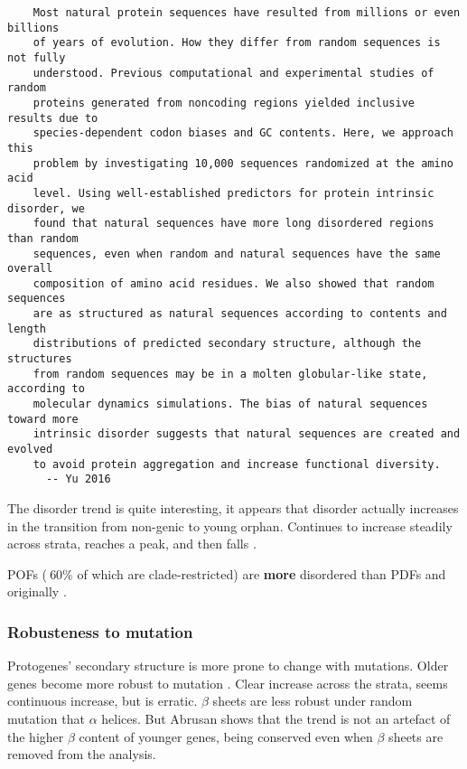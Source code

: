     \begin{verbatim}
    Most natural protein sequences have resulted from millions or even billions
    of years of evolution. How they differ from random sequences is not fully
    understood. Previous computational and experimental studies of random
    proteins generated from noncoding regions yielded inclusive results due to
    species-dependent codon biases and GC contents. Here, we approach this
    problem by investigating 10,000 sequences randomized at the amino acid
    level. Using well-established predictors for protein intrinsic disorder, we
    found that natural sequences have more long disordered regions than random
    sequences, even when random and natural sequences have the same overall
    composition of amino acid residues. We also showed that random sequences
    are as structured as natural sequences according to contents and length
    distributions of predicted secondary structure, although the structures
    from random sequences may be in a molten globular-like state, according to
    molecular dynamics simulations. The bias of natural sequences toward more
    intrinsic disorder suggests that natural sequences are created and evolved
    to avoid protein aggregation and increase functional diversity.
      -- Yu 2016
    \end{verbatim}

    The disorder trend is quite interesting, it appears that disorder
    actually increases in the transition from non-genic to young
    orphan. Continues to increase steadily across strata, reaches a
    peak, and then falls \cite{carvunis_proto-genes_2012}.

    POFs ($~$60\% of which are clade-restricted) are \textbf{more}
    disordered than PDFs \cite[review]{gollery_pofs:_2007} and
    originally \cite{gollery_what_2006}.

  \subsubsection{Robusteness to mutation}

    Protogenes' secondary structure is more prone to change with
    mutations.  Older genes become more robust to mutation
    \cite{abrusan_integration_2013}. Clear increase across the strata,
    seems continuous increase, but is erratic. $\beta$ sheets are less
    robust under random mutation that $\alpha$ helices. But Abrusan
    shows that the trend is not an artefact of the higher $\beta$
    content of younger genes, being conserved even when $\beta$ sheets
    are removed from the analysis.

